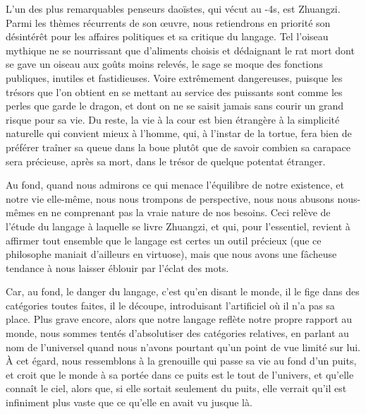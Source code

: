 L'un des plus remarquables penseurs daoïstes, qui vécut au -4s, est Zhuangzi.
Parmi les thèmes récurrents de son œuvre, nous retiendrons en priorité son désintérêt pour les affaires politiques et sa critique du langage.
Tel l'oiseau mythique ne se
nourrissant que d'aliments choisis et dédaignant le rat mort dont se gave un oiseau aux
goûts moins relevés, le sage se moque des fonctions publiques, inutiles et fastidieuses.
Voire extrêmement dangereuses, puisque les trésors que l'on obtient en se mettant au service des puissants sont comme les perles que garde le dragon, et dont on ne se saisit
jamais sans courir un grand risque pour sa vie.
Du reste, la vie à la cour est bien étrangère
à la simplicité naturelle qui convient mieux à l'homme, qui, à l'instar de la tortue, fera
bien de préférer traîner sa queue dans la boue plutôt que de savoir combien sa carapace
sera précieuse, après sa mort, dans le trésor de quelque potentat étranger.

Au fond, quand nous admirons ce qui menace l'équilibre de notre existence, et notre vie
elle-même, nous nous trompons de perspective, nous nous abusons nous-mêmes en ne
comprenant pas la vraie nature de nos besoins.
Ceci relève de l'étude du langage à laquelle se livre Zhuangzi, et qui, pour l'essentiel, revient à affirmer tout ensemble que le
langage est certes un outil précieux (que ce philosophe maniait d'ailleurs en virtuose),
mais que nous avons une fâcheuse tendance à nous laisser éblouir par l'éclat des mots.

Car, au fond, le danger du langage, c'est qu'en disant le monde, il le fige dans des catégories toutes faites, il le découpe, introduisant l'artificiel où il n'a pas sa place.
Plus grave
encore, alors que notre langage reflète notre propre rapport au monde, nous sommes tentés d'absolutiser des catégories relatives, en parlant au nom de l'universel quand nous
n'avons pourtant qu'un point de vue limité sur lui.
À cet égard, nous ressemblons à la
grenouille qui passe sa vie au fond d'un puits, et croit que le monde à sa portée dans ce
puits est le tout de l'univers, et qu'elle connaît le ciel, alors que, si elle sortait seulement
du puits, elle verrait qu'il est infiniment plus vaste que ce qu'elle en avait vu jusque là.

